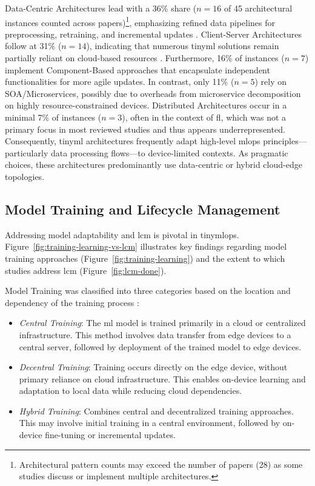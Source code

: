 Data-Centric Architectures lead with a 36\% share ($n=16$ of 45 architectural instances counted across papers)\footnote{Architectural pattern counts may exceed the number of papers (28) as some studies discuss or implement multiple architectures.}, emphasizing refined data pipelines for preprocessing, retraining, and incremental updates \cite{rajEdgeMLOpsAutomation2021, leTinyMLOpsRealtimeUltralow2023a}. Client-Server Architectures follow at 31\% ($n=14$), indicating that numerous \gls{tinyml} solutions remain partially reliant on cloud-based resources \cite{minSensiXBringingMLOps2023, fraidlingTinyMachineLearning2023}. Furthermore, 16\% of instances ($n=7$) implement Component-Based approaches that encapsulate independent functionalities for more agile updates. In contrast, only 11\% ($n=5$) rely on SOA/Microservices, possibly due to overheads from microservice decomposition on highly resource-constrained devices. Distributed Architectures occur in a minimal 7\% of instances ($n=3$), often in the context of  \gls{fl}, which was not a primary focus in most reviewed studies and thus appears underrepresented. Consequently, \gls{tinyml} architectures frequently adapt high-level \gls{mlops} principles—particularly data processing flows—to device-limited contexts. As pragmatic choices, these architectures predominantly use data-centric or hybrid cloud-edge topologies.

\subsection{Model Training and Lifecycle Management}
\label{ssec:TrainingManagementResults}

Addressing model adaptability and \gls{lcm} is pivotal in \gls{tinymlops}. Figure~\ref{fig:training-learning-vs-lcm} illustrates key findings regarding model training approaches (Figure~\ref{fig:training-learning}) and the extent to which studies address \gls{lcm} (Figure~\ref{fig:lcm-done}).

Model Training was classified into three categories based on the location and dependency of the training process \cite{capogrossoMachineLearningOrientedSurvey2024}:

\begin{itemize}[noitemsep, topsep=0pt]
    \item \textit{Central Training}: The \gls{ml} model is trained primarily in a cloud or centralized infrastructure. This method involves data transfer from edge devices to a central server, followed by deployment of the trained model to edge devices.
    \item \textit{Decentral Training}: Training occurs directly on the edge device, without primary reliance on cloud infrastructure. This enables on-device learning and adaptation to local data while reducing cloud dependencies.
    \item \textit{Hybrid Training}: Combines central and decentralized training approaches. This may involve initial training in a central environment, followed by on-device fine-tuning or incremental updates.
\end{itemize}


